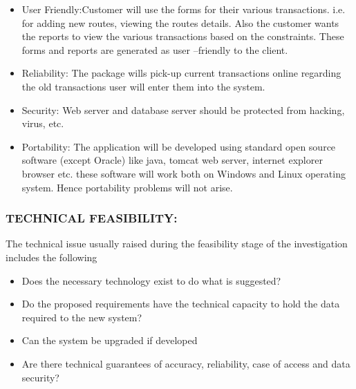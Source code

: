 \begin{itemize}
\item User Friendly:Customer will use the forms for their various transactions. i.e. for adding new routes, viewing the routes details. Also the customer wants the reports to view the various   transactions based on the constraints. These forms and reports are generated as user –friendly to the client.
\item  Reliability: The package wills pick-up current transactions online regarding the old transactions user will enter them into the system.



\item Security: Web server and database server should be protected from hacking, virus, etc.
\item Portability: The application will be developed using standard open source software (except Oracle) like java, tomcat web server, internet explorer browser etc. these software will work both on Windows and Linux operating system. Hence portability problems will not arise. 
\end{itemize}

\subsubsection{TECHNICAL FEASIBILITY:}
The technical issue usually raised during the feasibility stage of the investigation includes             
the following
\begin{itemize}
\item Does the necessary technology exist to do what is suggested?
\item Do the proposed requirements have the technical capacity to hold the data required to the 
new system?
\item Can the system be upgraded if developed 
\item Are there technical guarantees of accuracy, reliability, case of access and data security?
\end{itemize}
 




